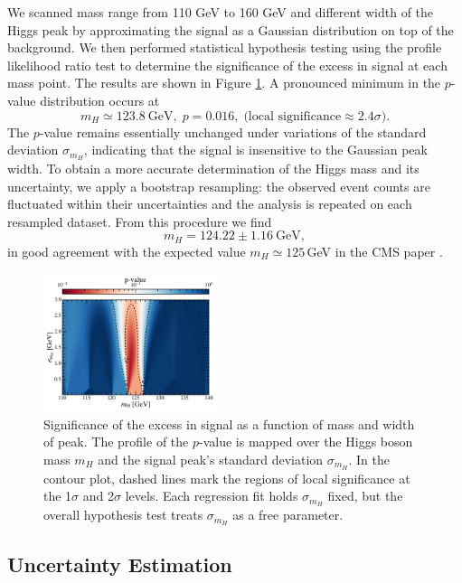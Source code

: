 We scanned mass range from 110 GeV to 160 GeV and different width of the Higgs peak by approximating the signal as a Gaussian distribution on top of the background. We then performed statistical hypothesis testing using the profile likelihood ratio test to determine the significance of the excess in signal at each mass point. The results are shown in Figure \ref{fig:significance}. A pronounced minimum in the $p$-value distribution occurs at
\[
  m_H \simeq 123.8\ \mathrm{GeV}, 
  \; p = 0.016,
  \;\text{(local significance}\approx2.4\sigma\text{)}.
\]
The $p$-value remains essentially unchanged under variations of the standard deviation $\sigma_{m_H}$, indicating that the signal is insensitive to the Gaussian peak width. To obtain a more accurate determination of the Higgs mass and its uncertainty, we apply a bootstrap resampling: the observed event counts are fluctuated within their uncertainties and the analysis is repeated on each resampled dataset. From this procedure we find
\[
  m_H = 124.22 \pm 1.16\ \mathrm{GeV},
\]
in good agreement with the expected value $m_H\simeq125\,$GeV in the CMS paper \cite{CMS:2012qbp}. 

\begin{figure}[h]
  \centering
  \includegraphics[width=0.45\textwidth]{Figures/p-value-2.png}
  \caption{Significance of the excess in signal as a function of mass and width of peak. The profile of the $p$-value is mapped over the Higgs boson mass $m_H$ and the signal peak's standard deviation $\sigma_{m_H}$.  In the contour plot, dashed lines mark the regions of local significance at the 1$\sigma$ and 2$\sigma$ levels. Each regression fit holds $\sigma_{m_H}$ fixed, but the overall hypothesis test treats $\sigma_{m_H}$ as a free parameter.}
  \label{fig:significance}
\end{figure}


\subsection{Uncertainty Estimation}


